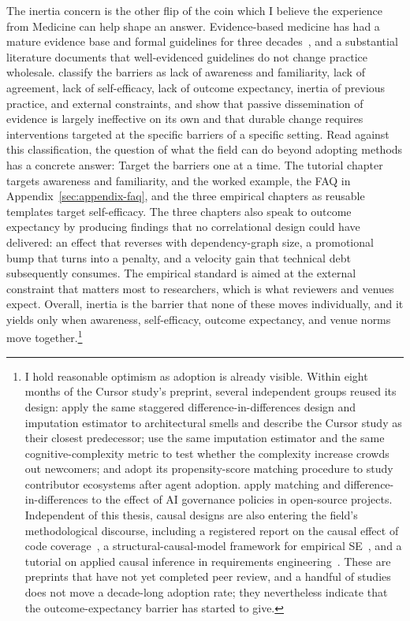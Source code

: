 The inertia concern is the other flip of the coin which I believe the experience from Medicine can help shape an answer.
Evidence-based medicine has had a mature evidence base and formal guidelines for three decades~\cite{sackett1996evidence}, and a substantial literature documents that well-evidenced guidelines do not change practice wholesale.
\citet{cabana1999why} classify the barriers as lack of awareness and familiarity, lack of agreement, lack of self-efficacy, lack of outcome expectancy, inertia of previous practice, and external constraints, and \citet{grol2003best} show that passive dissemination of evidence is largely ineffective on its own and that durable change requires interventions targeted at the specific barriers of a specific setting.
Read against this classification, the question of what the field can do beyond adopting methods has a concrete answer: Target the barriers one at a time.
The tutorial chapter targets awareness and familiarity, and the worked example, the FAQ in Appendix~\ref{sec:appendix-faq}, and the three empirical chapters as reusable templates target self-efficacy.
The three chapters also speak to outcome expectancy by producing findings that no correlational design could have delivered: an effect that reverses with dependency-graph size, a promotional bump that turns into a penalty, and a velocity gain that technical debt subsequently consumes.
The empirical standard is aimed at the external constraint that matters most to researchers, which is what reviewers and venues expect.
Overall, inertia is the barrier that none of these moves individually, and it yields only when awareness, self-efficacy, outcome expectancy, and venue norms move together.\footnote{
  I hold reasonable optimism as adoption is already visible.
  Within eight months of the Cursor study's preprint, several independent groups reused its design: \citet{DBLP:journals/corr/abs-2606-13298} apply the same staggered difference-in-differences design and \citet{borusyak2024revisiting} imputation estimator to architectural smells and describe the Cursor study as their closest predecessor; \citet{DBLP:journals/corr/abs-2607-01810} use the same imputation estimator and the same cognitive-complexity metric to test whether the complexity increase crowds out newcomers; and \citet{DBLP:journals/corr/abs-2606-26289} adopt its propensity-score matching procedure to study contributor ecosystems after agent adoption.
  \citet{DBLP:journals/corr/abs-2608-03329} apply matching and difference-in-differences to the effect of AI governance policies in open-source projects.
  Independent of this thesis, causal designs are also entering the field's methodological discourse, including a registered report on the causal effect of code coverage~\cite{DBLP:journals/corr/abs-2602-03585}, a structural-causal-model framework for empirical SE~\cite{DBLP:journals/corr/abs-2605-28482}, and a tutorial on applied causal inference in requirements engineering~\cite{DBLP:journals/corr/abs-2511-03875}.
  These are preprints that have not yet completed peer review, and a handful of studies does not move a decade-long adoption rate; they nevertheless indicate that the outcome-expectancy barrier has started to give.
}

